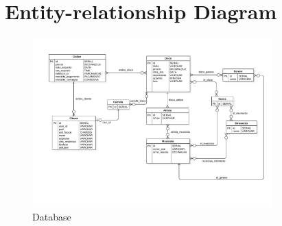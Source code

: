 \documentclass[a4paper,titlepage]{book}
\begin{document}
\section{Entity-relationship Diagram}
\begin{figure}[H]
\center
\includegraphics[width=350px]{img/ERD.pdf}
\caption{Database \label{fig:cla}}
\end{figure}

\backmatter



\nocite{ingsft}
\nocite{ingreq}
\nocite{inglab}
\end{document}
